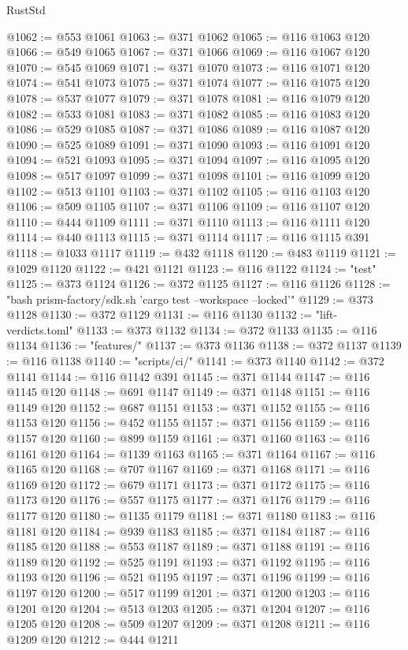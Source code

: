 \begin{lexlean}{RustStd}
\begin{coremodule}
@1062 := @553 @1061
@1063 := @371 @1062
@1065 := @116 @1063 @120
@1066 := @549 @1065
@1067 := @371 @1066
@1069 := @116 @1067 @120
@1070 := @545 @1069
@1071 := @371 @1070
@1073 := @116 @1071 @120
@1074 := @541 @1073
@1075 := @371 @1074
@1077 := @116 @1075 @120
@1078 := @537 @1077
@1079 := @371 @1078
@1081 := @116 @1079 @120
@1082 := @533 @1081
@1083 := @371 @1082
@1085 := @116 @1083 @120
@1086 := @529 @1085
@1087 := @371 @1086
@1089 := @116 @1087 @120
@1090 := @525 @1089
@1091 := @371 @1090
@1093 := @116 @1091 @120
@1094 := @521 @1093
@1095 := @371 @1094
@1097 := @116 @1095 @120
@1098 := @517 @1097
@1099 := @371 @1098
@1101 := @116 @1099 @120
@1102 := @513 @1101
@1103 := @371 @1102
@1105 := @116 @1103 @120
@1106 := @509 @1105
@1107 := @371 @1106
@1109 := @116 @1107 @120
@1110 := @444 @1109
@1111 := @371 @1110
@1113 := @116 @1111 @120
@1114 := @440 @1113
@1115 := @371 @1114
@1117 := @116 @1115 @391
@1118 := @1033 @1117
@1119 := @432 @1118
@1120 := @483 @1119
@1121 := @1029 @1120
@1122 := @421 @1121
@1123 := @116 @1122
@1124 := "test"
@1125 := @373 @1124
@1126 := @372 @1125
@1127 := @116 @1126
@1128 := "bash prism-factory/sdk.sh 'cargo test --workspace --locked'"
@1129 := @373 @1128
@1130 := @372 @1129
@1131 := @116 @1130
@1132 := "lift-verdicts.toml"
@1133 := @373 @1132
@1134 := @372 @1133
@1135 := @116 @1134
@1136 := "features/"
@1137 := @373 @1136
@1138 := @372 @1137
@1139 := @116 @1138
@1140 := "scripts/ci/"
@1141 := @373 @1140
@1142 := @372 @1141
@1144 := @116 @1142 @391
@1145 := @371 @1144
@1147 := @116 @1145 @120
@1148 := @691 @1147
@1149 := @371 @1148
@1151 := @116 @1149 @120
@1152 := @687 @1151
@1153 := @371 @1152
@1155 := @116 @1153 @120
@1156 := @452 @1155
@1157 := @371 @1156
@1159 := @116 @1157 @120
@1160 := @899 @1159
@1161 := @371 @1160
@1163 := @116 @1161 @120
@1164 := @1139 @1163
@1165 := @371 @1164
@1167 := @116 @1165 @120
@1168 := @707 @1167
@1169 := @371 @1168
@1171 := @116 @1169 @120
@1172 := @679 @1171
@1173 := @371 @1172
@1175 := @116 @1173 @120
@1176 := @557 @1175
@1177 := @371 @1176
@1179 := @116 @1177 @120
@1180 := @1135 @1179
@1181 := @371 @1180
@1183 := @116 @1181 @120
@1184 := @939 @1183
@1185 := @371 @1184
@1187 := @116 @1185 @120
@1188 := @553 @1187
@1189 := @371 @1188
@1191 := @116 @1189 @120
@1192 := @525 @1191
@1193 := @371 @1192
@1195 := @116 @1193 @120
@1196 := @521 @1195
@1197 := @371 @1196
@1199 := @116 @1197 @120
@1200 := @517 @1199
@1201 := @371 @1200
@1203 := @116 @1201 @120
@1204 := @513 @1203
@1205 := @371 @1204
@1207 := @116 @1205 @120
@1208 := @509 @1207
@1209 := @371 @1208
@1211 := @116 @1209 @120
@1212 := @444 @1211

\end{coremodule}
\end{lexlean}
